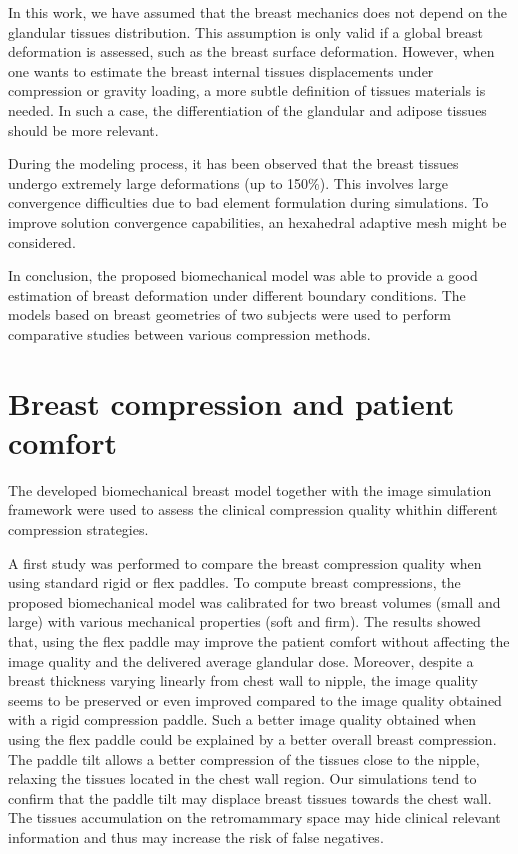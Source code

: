 In this work, we have assumed that the breast mechanics does not depend on the glandular tissues distribution. This assumption is only valid if a global breast deformation is assessed, such as the breast surface deformation. However, when one wants to estimate the breast internal tissues displacements under compression or gravity loading, a more subtle definition of tissues materials is needed. In such a case, the differentiation of the glandular and adipose tissues should be more relevant.   
   
During the modeling process, it has been observed that the breast tissues undergo extremely large deformations (up to 150\%). This involves large convergence difficulties due to bad element formulation during simulations. To improve solution convergence capabilities, an hexahedral adaptive mesh might be considered.

In conclusion, the proposed biomechanical model was able to provide a good estimation of breast deformation under different boundary conditions. The models based on breast geometries of two subjects were used to perform comparative studies between various compression methods.
 
\section{Breast compression and patient comfort}
The developed biomechanical breast model together with the image simulation framework were used to assess the clinical compression quality whithin different compression strategies.

A first study was performed to compare the breast compression quality when using standard rigid or flex paddles. To compute breast compressions, the proposed biomechanical model was calibrated for two  breast volumes (small and large) with various mechanical properties (soft and firm). The results showed that, using the flex paddle may improve the patient comfort without affecting the image quality and the delivered average glandular dose. Moreover, despite a breast thickness varying linearly from chest wall to nipple, the image quality seems to be preserved or even improved compared to the image quality obtained with a rigid compression paddle. Such a better image quality obtained when using the flex paddle could be explained by a better overall breast compression. The paddle tilt allows a better compression of the tissues close to the nipple, relaxing the tissues located in the chest wall region. Our simulations tend to confirm that the paddle tilt may displace breast tissues towards the chest wall. The tissues accumulation on the retromammary space may hide clinical relevant information and thus may increase the risk of false negatives. 

